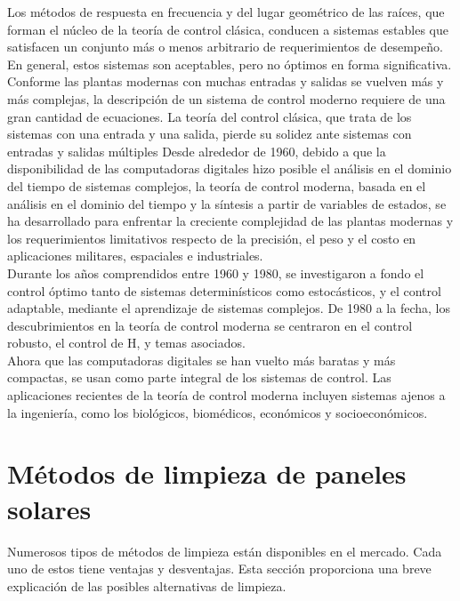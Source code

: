 Los métodos de respuesta en frecuencia y del lugar geométrico de las raíces, que forman el núcleo de la teoría de control clásica, conducen a sistemas estables que satisfacen un conjunto más o menos arbitrario de requerimientos de desempeño. En general, estos sistemas son aceptables, pero no óptimos en forma significativa.
Conforme las plantas modernas con muchas entradas y salidas se vuelven más y más complejas, la descripción de un sistema de control moderno requiere de una gran cantidad de ecuaciones. La teoría del control clásica, que trata de los sistemas con una entrada y una salida, pierde su solidez ante sistemas con entradas y salidas múltiples Desde alrededor de 1960, debido a que la disponibilidad de las computadoras digitales hizo posible el análisis en el dominio del tiempo de sistemas complejos, la teoría de control moderna, basada en el análisis en el dominio del tiempo y la síntesis a partir de variables de estados, se ha desarrollado para enfrentar la creciente complejidad de las plantas modernas y los requerimientos limitativos respecto de la precisión, el peso y el costo en aplicaciones militares, espaciales e industriales.\\

Durante los años comprendidos entre 1960 y 1980, se investigaron a fondo el control óptimo tanto de sistemas determinísticos como estocásticos, y el control adaptable, mediante el aprendizaje de sistemas complejos. De 1980 a la fecha, los descubrimientos en la teoría de control moderna se centraron en el control robusto, el control de H, y temas asociados.\\

Ahora que las computadoras digitales se han vuelto más baratas y más compactas, se usan como parte integral de los sistemas de control. Las aplicaciones recientes de la teoría de control moderna incluyen sistemas ajenos a la ingeniería, como los biológicos, biomédicos, económicos y socioeconómicos.

\section{Métodos de limpieza de paneles solares}
Numerosos tipos de métodos de limpieza están disponibles en el mercado. Cada uno de estos tiene ventajas y desventajas. Esta sección proporciona una breve explicación de las posibles alternativas de limpieza.
